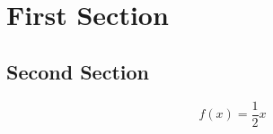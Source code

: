 \documentclass{article}
\begin{document}
\section{First Section}

\subsection{Second Section}

\[ f (x) = \frac{1}{2} x \]
\end{document}

